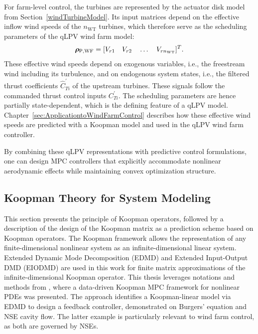 For farm-level control, the turbines are represented by the actuator disk model from Section~\ref{windTurbineModel}. Its input matrices depend on the effective inflow wind speeds of the $n_{\text{WT}}$ turbines, which therefore serve as the scheduling parameters of the qLPV wind farm model:
\begin{equation} \label{eq:rhoWF}
    \bm{\rho}_{\mathsf{P},\text{WF}} = [V_{r1} \quad V_{r2} \quad \ldots \quad V_{r n_{\text{WT}}}]^T.
\end{equation}
These effective wind speeds depend on exogenous variables, i.e., the freestream wind including its turbulence, and on endogenous system states, i.e., the filtered thrust coefficients $\hat{C}^\prime_{Ti}$ of the upstream turbines. These signals follow the commanded thrust control inputs $C^\prime_{Ti}$. The scheduling parameters are hence partially state-dependent, which is the defining feature of a qLPV model. Chapter~\ref{sec:ApplicationtoWindFarmControl} describes how these effective wind speeds are predicted with a Koopman model and used in the qLPV wind farm controller.

By combining these qLPV representations with predictive control formulations, one can design MPC controllers that explicitly accommodate nonlinear aerodynamic effects while maintaining convex optimization structure. 



\subsection{Koopman Theory for System Modeling} \label{sec:Koopman}

This section presents the principle of Koopman operators, followed by a description of the design of the Koopman matrix as a prediction scheme based on Koopman operators. The Koopman framework allows the representation of any finite-dimensional nonlinear system as an infinite-dimensional linear system. Extended Dynamic Mode Decomposition (EDMD) and Extended Input-Output DMD (EIODMD) are used in this work for finite matrix approximations of the infinite-dimensional Koopman operator. This thesis leverages notations and methods from \cite{arbabi2018data}, where a data-driven Koopman MPC framework for nonlinear PDEs was presented. The approach identifies a Koopman-linear model via EDMD to design a feedback controller, demonstrated on Burgers’ equation and NSE cavity flow. The latter example is particularly relevant to wind farm control, as both are governed by NSEs.

